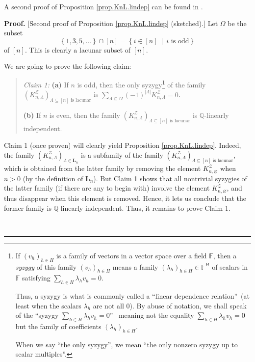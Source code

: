 \documentclass[numbers=enddot,12pt,final,onecolumn,notitlepage]{scrartcl}%
\theoremstyle{definition}
\newenvironment{statement}{\begin{quote}}{\end{quote}}
\newenvironment{proof}[1][Proof]{\noindent\textbf{#1.} }{\ \rule{0.5em}{0.5em}}
\newenvironment{verlong}{}{}
\newenvironment{vershort}{}{}
\let\sumnonlimits\sum
\renewcommand{\sum}{\sumnonlimits\limits}
\begin{document}
\begin{vershort}
A second proof of Proposition \ref{prop.KnL.lindep} can be found in
\cite{verlong}.
\end{vershort}

\begin{verlong}
\begin{proof}
[Second proof of Proposition \ref{prop.KnL.lindep} (sketched).]
Let $\Omega$ be the subset
\[
\left\{  1,3,5,\ldots\right\}  \cap\left[  n\right]  =\left\{  i\in\left[
n\right]  \ \mid\ i\text{ is odd}\right\}
\]
of $\left[  n\right]  $. This is
clearly a lacunar subset of $\left[  n\right]  $.

We are going to prove the following claim:

\begin{statement}
\textit{Claim 1:} \textbf{(a)} If $n$ is odd, then the only syzygy\footnote{If
$\left(  v_{h}\right)  _{h\in H}$ is a family of vectors in a vector space
over a field $\mathbb{F}$, then a \textit{syzygy} of this family $\left(
v_{h}\right)  _{h\in H}$ means a family $\left(  \lambda_{h}\right)  _{h\in
H}\in\mathbb{F}^{H}$ of scalars in $\mathbb{F}$ satisfying $\sum_{h\in
H}\lambda_{h}v_{h}=0$.
\par
Thus, a syzygy is what is commonly called a \textquotedblleft linear
dependence relation\textquotedblright\ (at least when the scalars $\lambda
_{h}$ are not all $0$). By abuse of notation, we shall speak of the
\textquotedblleft syzygy $\sum_{h\in H}\lambda_{h}v_{h}=0$\textquotedblright%
\ meaning not the equality $\sum_{h\in H}\lambda_{h}v_{h}=0$ but the family of
coefficients $\left(  \lambda_{h}\right)  _{h\in H}$.
\par
When we say \textquotedblleft the only syzygy\textquotedblright, we mean
\textquotedblleft the only nonzero syzygy up to scalar
multiples\textquotedblright.} of the family
$\left(  K_{n,\Lambda }^{\mathcal{Z}}\right) %
_{\Lambda\subseteq\left[  n\right]  \text{ is lacunar}}$
is $\sum_{\Lambda\subseteq\Omega}\left(  -1\right)  ^{\left\vert
\Lambda\right\vert }K_{n,\Lambda}^{\mathcal{Z}}=0$.

\textbf{(b)} If $n$ is even, then the family $\left(  K_{n,\Lambda
}^{\mathcal{Z}}\right)  _{\Lambda\subseteq\left[  n\right]  \text{ is
lacunar}}$ is $\mathbb{Q}$-linearly independent.
\end{statement}

Claim 1 (once proven) will clearly yield
Proposition \ref{prop.KnL.lindep}. Indeed, the family
$\left(  K_{n,\Lambda}^{\mathcal{Z}}\right)  _{\Lambda\in \mathbf{L}_n}$
is a subfamily of the family
$\left(  K_{n,\Lambda }^{\mathcal{Z}}\right) %
_{\Lambda\subseteq\left[  n\right]  \text{ is lacunar}}$,
which is obtained from the latter family by removing the element
$K_{n,\varnothing}^{\mathcal{Z}}$ when $n > 0$ (by the definition
of $\mathbf{L}_n$).
But Claim 1 shows that all nontrivial syzygies of the latter family
(if there are any to begin with) involve the element
$K_{n,\varnothing}^{\mathcal{Z}}$, and thus disappear when this
element is removed.
Hence, it lets us conclude that the former family is
$\mathbb{Q}$-linearly independent.
Thus, it remains to prove Claim 1.


\end{proof}
\end{verlong}
\end{document}
